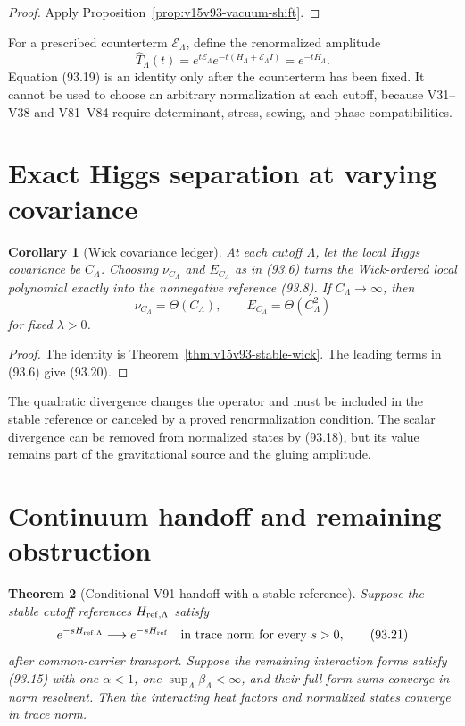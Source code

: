\documentclass[11pt]{article}
\newtheorem{theorem}{Theorem}[section]
\newtheorem{corollary}[theorem]{Corollary}
\theoremstyle{remark}
\begin{document}
\begin{proof}
Apply Proposition~\ref{prop:v15v93-vacuum-shift}.
\end{proof}

For a prescribed counterterm \(\mathcal E_\Lambda\), define the
renormalized amplitude
\[
 \widehat T_\Lambda(t)
 =e^{t\mathcal E_\Lambda}e^{-t(H_\Lambda+\mathcal E_\Lambda I)}
 =e^{-tH_\Lambda}.                                    \tag{93.19}
\]
Equation (93.19) is an identity only after the counterterm has been
fixed.  It cannot be used to choose an arbitrary normalization at
each cutoff, because V31--V38 and V81--V84 require determinant,
stress, sewing, and phase compatibilities.

\section{Exact Higgs separation at varying covariance}

\begin{corollary}[Wick covariance ledger]
\label{cor:v15v93-covariance}
At each cutoff \(\Lambda\), let the local Higgs covariance be
\(C_\Lambda\).  Choosing \(\nu_{C_\Lambda}\) and
\(E_{C_\Lambda}\) as in (93.6) turns the Wick-ordered local
polynomial exactly into the nonnegative reference (93.8).
If \(C_\Lambda\to\infty\), then
\[
 \nu_{C_\Lambda}=\Theta(C_\Lambda),\qquad
 E_{C_\Lambda}=\Theta(C_\Lambda^2)                    \tag{93.20}
\]
for fixed \(\lambda>0\).
\end{corollary}

\begin{proof}
The identity is Theorem~\ref{thm:v15v93-stable-wick}.  The leading
terms in (93.6) give (93.20).
\end{proof}

The quadratic divergence changes the operator and must be included
in the stable reference or canceled by a proved renormalization
condition.  The scalar divergence can be removed from normalized
states by (93.18), but its value remains part of the gravitational
source and the gluing amplitude.

\section{Continuum handoff and remaining obstruction}

\begin{theorem}[Conditional V91 handoff with a stable reference]
\label{thm:v15v93-handoff}
Suppose the stable cutoff references
\(H_{{\rm ref},\Lambda}\) satisfy
\[
 e^{-sH_{{\rm ref},\Lambda}}
 \longrightarrow e^{-sH_{\rm ref}}
 \quad\hbox{in trace norm for every }s>0,              \tag{93.21}
\]
after common-carrier transport.  Suppose the remaining interaction
forms satisfy (93.15) with one \(\alpha<1\), one
\(\sup_\Lambda\beta_\Lambda<\infty\), and their full form sums
converge in norm resolvent.  Then the interacting heat factors and
normalized states converge in trace norm.
\end{theorem}
\end{document}
